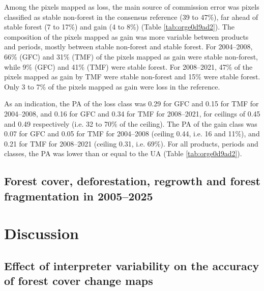 \documentclass[paper=a4, fontsize=12pt, DIV=13, english, dvipsnames]{scrartcl}
\begin{document}
Among the pixels mapped as loss, the main source of commission error was pixels classified as stable non-forest in the consensus reference (39 to 47\%), far ahead of stable forest (7 to 17\%) and gain (4 to 8\%) (Table \ref{tab:orge0d9ad2}). The composition of the pixels mapped as gain was more variable between products and periods, mostly between stable non-forest and stable forest. For 2004--2008, 66\% (GFC) and 31\% (TMF) of the pixels mapped as gain were stable non-forest, while 9\% (GFC) and 41\% (TMF) were stable forest. For 2008--2021, 47\% of the pixels mapped as gain by TMF were stable non-forest and 15\% were stable forest. Only 3 to 7\% of the pixels mapped as gain were loss in the reference.

As an indication, the PA of the loss class was 0.29 for GFC and 0.15 for TMF for 2004--2008, and 0.16 for GFC and 0.34 for TMF for 2008--2021, for ceilings of 0.45 and 0.49 respectively (i.e. 32 to 70\% of the ceiling). The PA of the gain class was 0.07 for GFC and 0.05 for TMF for 2004--2008 (ceiling 0.44, i.e. 16 and 11\%), and 0.21 for TMF for 2008--2021 (ceiling 0.31, i.e. 69\%). For all products, periods and classes, the PA was lower than or equal to the UA (Table \ref{tab:orge0d9ad2}).
\subsection{Forest cover, deforestation, regrowth and forest fragmentation in 2005--2025}
\label{sec:org5d37d2a}

\newpage
\section{Discussion}
\label{sec:org99a38b8}

\subsection{Effect of interpreter variability on the accuracy of forest cover change maps}
\label{sec:org57e41a7}
\end{document}
